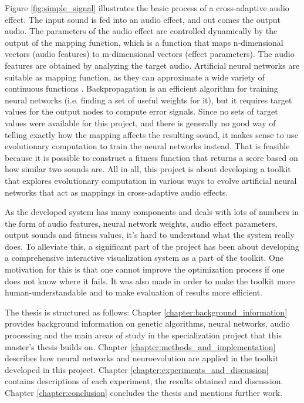 Figure \ref{fig:simple_signal} illustrates the basic process of a cross-adaptive audio effect. The input sound is fed into an audio effect, and out comes the output audio. The parameters of the audio effect are controlled dynamically by the output of the mapping function, which is a function that maps n-dimensional vectors (audio features) to m-dimensional vectors (effect parameters). The audio features are obtained by analyzing the target audio. Artificial neural networks are suitable as mapping function, as they can approximate a wide variety of continuous functions \citep{hornik1991}. Backpropagation \citep{werbos1982, lecun1998} is an efficient algorithm for training neural networks (i.e. finding a set of useful weights for it), but it requires target values for the output nodes to compute error signals. Since no sets of target values were available for this project, and there is generally no good way of telling exactly how the mapping affects the resulting sound, it makes sense to use evolutionary computation to train the neural networks instead. That is feasible because it is possible to construct a fitness function that returns a score based on how similar two sounds are. All in all, this project is about developing a toolkit that explores evolutionary computation in various ways to evolve artificial neural networks that act as mappings in cross-adaptive audio effects.

As the developed system has many components and deals with lots of numbers in the form of audio features, neural network weights, audio effect parameters, output sounds and fitness values, it’s hard to understand what the system really does. To alleviate this, a significant part of the project has been about developing a comprehensive interactive visualization system as a part of the toolkit. One motivation for this is that one cannot improve the optimization process if one does not know where it fails. It was also made in order to make the toolkit more human-understandable and to make evaluation of results more efficient.

The thesis is structured as follows: Chapter \ref{chapter:background_information} provides background information on genetic algorithms, neural networks, audio processing and the main areas of study in the specialization project that this master's thesis builds on. Chapter \ref{chapter:methods_and_implementation} describes how neural networks and neuroevolution are applied in the toolkit developed in this project. Chapter \ref{chapter:experiments_and_discussion} contains descriptions of each experiment, the results obtained and discussion. Chapter \ref{chapter:conclusion} concludes the thesis and mentions further work.
